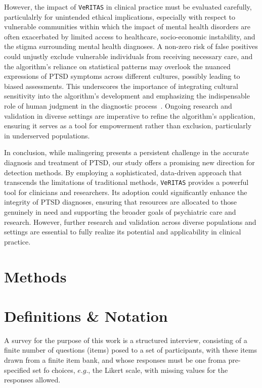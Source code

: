 \documentclass[onecolumn,10pt]{IEEEtran}
\def\vrts{\texttt{VeRITAS}\xspace}
\begin{document}
However, the impact of \vrts in  clinical practice must be evaluated carefully, particulalrly for unintended  ethical implications, especially with respect to  vulnerable communities within which  the impact of mental health disorders are often exacerbated by limited access to healthcare, socio-economic instability, and the stigma surrounding mental health diagnoses. A non-zero  risk of false positives  could unjustly exclude vulnerable individuals from receiving necessary care, and  the algorithm's reliance on statistical patterns may overlook the nuanced expressions of PTSD symptoms across different cultures, possibly leading to biased assessments. This underscores the importance of integrating cultural sensitivity into the algorithm's development and emphasizing the indispensable role of human judgment in the diagnostic process~\cite{DePaulo2003,ekman1991who}. Ongoing research and validation in diverse settings are imperative to refine the algorithm's application, ensuring it serves as a tool for empowerment rather than exclusion, particularly in underserved populations.



In conclusion, while malingering presents a persistent challenge in the accurate diagnosis and treatment of PTSD, our study offers a promising new direction for detection methods. By employing a sophisticated, data-driven approach that transcends the limitations of traditional methods, \vrts provides a powerful tool for clinicians and researchers. Its adoption could significantly enhance the integrity of PTSD diagnoses, ensuring that resources are allocated to those genuinely in need and supporting the broader goals of psychiatric care and research. However, further research and validation across diverse populations and settings are essential to fully realize its potential and applicability in clinical practice.

\section*{Methods}
\section{Definitions \& Notation}

\begin{defn}[Survey]
  A survey for the purpose of this work is a structured interview, consisting of a finite number of questions (items) posed to a set of participants, with these items drawn from a finite item bank, and  whose responses must be one froma pre-specified set fo choices, $e.g.$, the Likert scale, with missing values for the responses allowed. 
\end{defn}
\end{document}
